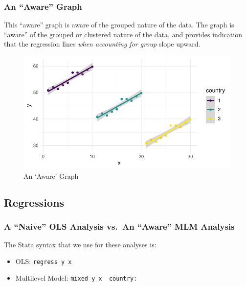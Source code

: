 \documentclass[
  letterpaper,
  DIV=11,
  numbers=noendperiod]{scrreprt}
\providecommand{\tightlist}{%
  \setlength{\itemsep}{0pt}\setlength{\parskip}{0pt}}\usepackage{longtable,booktabs,array}
\begin{document}
\hypertarget{an-aware-graph}{%
\subsubsection{An ``Aware'' Graph}\label{an-aware-graph}}

This ``aware'' graph is aware of the grouped nature of the data. The
graph is ``aware'' of the grouped or clustered nature of the data, and
provides indication that the regression lines \emph{when accounting for
group} slope upward.

\begin{figure}

{\centering \includegraphics{cross-sectional_files/figure-pdf/fig-aware-1.pdf}

}

\caption{\label{fig-aware}An `Aware' Graph}

\end{figure}

\hypertarget{regressions}{%
\subsection{Regressions}\label{regressions}}

\hypertarget{a-naive-ols-analysis-vs.-an-aware-mlm-analysis}{%
\subsubsection{A ``Naive'' OLS Analysis vs.~An ``Aware'' MLM
Analysis}\label{a-naive-ols-analysis-vs.-an-aware-mlm-analysis}}

The Stata syntax that we use for these analyses is:

\begin{itemize}
\tightlist
\item
  OLS: \texttt{regress\ y\ x}
\item
  Multilevel Model: \texttt{mixed\ y\ x\ \textbar{}\textbar{}\ country:}
\end{itemize}
\end{document}
